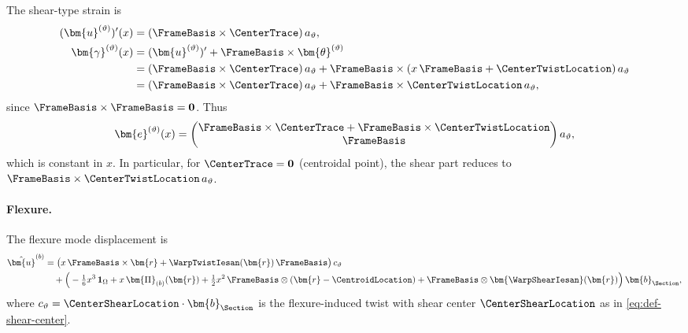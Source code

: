 The shear-type strain is
\begin{align*}
(\bm{u}^{(\vartheta)})'(x)
&=
(\FrameBasis \times \CenterTrace)\,a_\vartheta, \\
\bm{\gamma}^{(\vartheta)}(x)
&=
(\bm{u}^{(\vartheta)})' + \FrameBasis \times \bm{\theta}^{(\vartheta)} \\
&=
(\FrameBasis \times \CenterTrace)\,a_\vartheta
+ \FrameBasis \times (x\,\FrameBasis + \CenterTwistLocation)\,a_\vartheta \\
&=
(\FrameBasis \times \CenterTrace)\,a_\vartheta
+ \FrameBasis \times \CenterTwistLocation\,a_\vartheta,
\end{align*}
since $\FrameBasis \times \FrameBasis = \mathbf{0}$. 
%
Thus
\begin{equation}
\bm{e}^{(\vartheta)}(x)
=
\begin{pmatrix}
\FrameBasis \times \CenterTrace 
+ \FrameBasis \times \CenterTwistLocation \\
\FrameBasis
\end{pmatrix} a_\vartheta,
\end{equation}
which is constant in $x$. In particular, for $\CenterTrace = \mathbf{0}$ 
(centroidal point), the shear part reduces to 
$\FrameBasis \times \CenterTwistLocation\,a_\vartheta$.

\paragraph{Flexure.}

The flexure mode displacement is
\begin{equation*}
\begin{aligned}
\hat{\bm{u}}^{(b)} &= 
\big(x\,\FrameBasis \times \bm{r} + \WarpTwistIesan(\bm{r})\,\FrameBasis\big)\,c_\vartheta 
\\
&\quad
+ \Big( -\tfrac{1}{6}x^3\,\mathbf{1}_\Omega 
+ x\,\bm{\Pi}_{(b)}(\bm{r}) 
+ \tfrac{1}{2}x^2\,\FrameBasis \otimes (\bm{r} - \CentroidLocation) 
+ \FrameBasis \otimes \bm{\WarpShearIesan}(\bm{r}) \Big)\,\bm{b}_{\Section},
\end{aligned}
\end{equation*}
where $c_\vartheta = \CenterShearLocation \cdot \bm{b}_{\Section}$ is the 
flexure-induced twist with shear center $\CenterShearLocation$ as in 
\eqref{eq:def-shear-center}.

